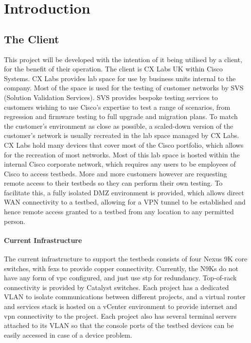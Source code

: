 \chapter{Introduction}
\label{chap:intro}

\section{The Client}
\label{intro:client}
This project will be developed with the intention of it
being utilised by a client, for the benefit of their operation.
The client is
CX Labs UK within Cisco Systems. CX Labs provides lab space for
use by business
units internal to the company. Most of the space is used for
the testing of
customer networks by SVS (Solution Validation Services). SVS
provides bespoke
testing services to customers wishing to use Cisco’s expertise
to test a range
of scenarios, from regression and firmware testing to full
upgrade and
migration plans.\newline
To match the customer's environment as close as
possible, a scaled-down
version of the customer's network is usually recreated
in the lab space managed
by CX Labs. CX Labs hold many devices that cover most
of the Cisco portfolio,
which allows for the recreation of most networks. Most
of this lab space is
hosted within the internal Cisco corporate network, which
requires any users to
be employees of Cisco to access testbeds. More and more
customers
however are requesting remote access to their testbeds so they can
perform their own testing. To facilitate this, a
fully isolated DMZ environment
is provided, which allows direct WAN
connectivity to a testbed, allowing for a
VPN tunnel to be established and
hence remote access granted to a testbed from
any location to any permitted
person.

\subsubsection{Current Infrastructure}
The current infrastructure to support the testbeds consists of four Nexus 9K
core switches, with \gls{fex}s to provide copper connectivity. Currently, the
N9Ks do not have any form of \gls{vpc} configured, and just use \gls{stp} for
redundancy. Top-of-rack connectivity is provided by Catalyst switches. Each
project has a dedicated VLAN to isolate communications between different
projects, and a virtual router and services stack is hosted on a vCenter
environment to provide internet and \gls{vpn} connectivity to the project. Each
project also has several terminal servers attached to its VLAN so that the
console ports of the testbed devices can be easily accessed in case of a device
problem.

